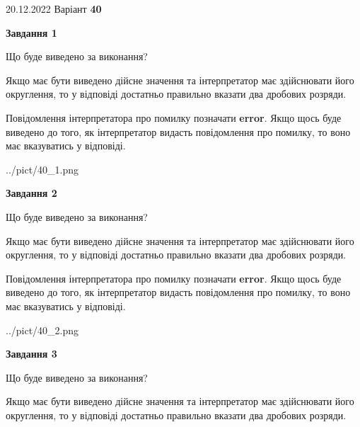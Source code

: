 \documentclass[12pt, ukrainian]{article}
\begin{document}
{20.12.2022 Варіант \No \textbf { 40 }\par}
{
\begin {Large}

{\begin {center}\textbf{Завдання 1}\end {center}}\par
Що буде виведено за виконання? \par

Якщо має бути виведено дійсне значення та інтерпретатор має здійснювати його округлення, 
то у відповіді достатньо правильно вказати два дробових розряди.

Повідомлення інтерпретатора про помилку позначати \textbf{error}.
Якщо щось буде виведено до того, як інтерпретатор видасть повідомлення про помилку, 
то воно має вказуватись у відповіді. \par

\begin{center}
	{../pict/40_1.png}
\end{center}
\newpage

{\begin {center}\textbf{Завдання 2}\end {center}}\par
Що буде виведено за виконання? \par

Якщо має бути виведено дійсне значення та інтерпретатор має здійснювати його округлення, 
то у відповіді достатньо правильно вказати два дробових розряди.

Повідомлення інтерпретатора про помилку позначати \textbf{error}.
Якщо щось буде виведено до того, як інтерпретатор видасть повідомлення про помилку, 
то воно має вказуватись у відповіді. \par

\begin{center}
	{../pict/40_2.png}
\end{center}
\newpage

{\begin {center}\textbf{Завдання 3}\end {center}}\par
Що буде виведено за виконання? \par

Якщо має бути виведено дійсне значення та інтерпретатор має здійснювати його округлення, 
то у відповіді достатньо правильно вказати два дробових розряди.


\end{Large}}
\end{document}

